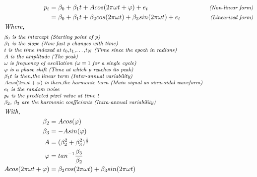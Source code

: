\documentclass[utf8]{frontiersSCNS}
\begin{document}
\begin{equation}\label{eq:2}
\begin{aligned}[b]%
p_t &= \beta_0 + \beta_1 t + A cos (2 \pi \omega t+ \varphi) + e_t & \footnotesize\text{\textit{(Non-linear form)}} \\
&= \beta_0  + \beta_1 t + \beta_2 cos(2 \pi \omega t) + \beta_3 sin(2 \pi \omega t) + e_t & \footnotesize\text{\textit{(Linearized form)}} \\
\omit \span \text{\textit{Where,}} \\
\omit \span \footnotesize\text{\textit{$\beta_0$ is the intercept (Starting point of p)}} \\[-5pt]
\omit \span \footnotesize\text{\textit{$\beta_1$ is the slope (How fast p changes with time)}} \\[-5pt]
\omit \span \footnotesize\text{\textit{$t$ is the time indexed at $t_0$,$t_1$,…,$t_N$ (Time since the epoch in radians)}} \\[-5pt]
\omit \span \footnotesize\text{\textit{$A$ is the amplitude (The peak)}} \\[-5pt]
\omit \span \footnotesize\text{\textit{$\omega$ is frequency of oscillation ($\omega = 1$ for a single cycle)}} \\[-5pt]
\omit \span \footnotesize\text{\textit{$\varphi$ is a phase shift (Time at which p reaches its peak)}} \\[-5pt]
\omit \span \footnotesize\text{\textit{$\beta_1 t$ is then,the linear term (Inter-annual variability)}} \\[-5pt]
\omit \span \footnotesize\text{\textit{$A cos (2 \pi  \omega t+ \varphi)$ is  then,the harmonic term (Main signal as sinusoidal waveform)}} \\[-5pt]
\omit \span \footnotesize\text{\textit{$e_t$ is the random noise}} \\[-5pt]
\omit \span \footnotesize\text{\textit{$p_t$ is the predicted pixel value at time t}} \\[-5pt]
\omit \span \footnotesize\text{\textit{$\beta_2$, $\beta_3$ are the harmonic coefficients (Intra-annual variability)}} \\
\omit \span \text{\textit{With,}} \\
\beta_2 &= A cos (\varphi) \\
\beta_3 &= - A sin (\varphi) \\
A &= (\beta_2^2+ \beta_3 ^2)^ \frac{1}{2} \\
\varphi &= tan^{-1} \frac{\beta_3}{\beta_2}\\
A cos (2 \pi  \omega t+ \varphi) &=  \beta_2 cos(2 \pi \omega t) + \beta_3 sin (2 \pi \omega t)%
\end{aligned}
\end{equation}
\end{document}
